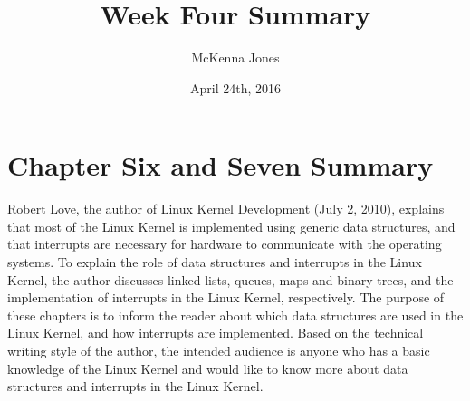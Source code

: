\documentclass[letterpaper,10pt]{article}
\title{Week Four Summary}
\author{McKenna Jones}
\date{April 24th, 2016}
\begin{document}
\begin{titlepage}
\maketitle
\end{titlepage}

\section{Chapter Six and Seven Summary}
Robert Love, the author of Linux Kernel Development (July 2, 2010), explains that most of the Linux Kernel is implemented using generic data structures, and that interrupts are necessary for hardware to communicate with the operating systems. To explain the role of data structures and interrupts in the Linux Kernel, the author discusses linked lists, queues, maps and binary trees, and the implementation of interrupts in the Linux Kernel, respectively. The purpose of these chapters is to inform the reader about which data structures are used in the Linux Kernel, and how interrupts are implemented. Based on the technical writing style of the author, the intended audience is anyone who has a basic knowledge of the Linux Kernel and would like to know more about data structures and interrupts in the Linux Kernel.
\end{document}
